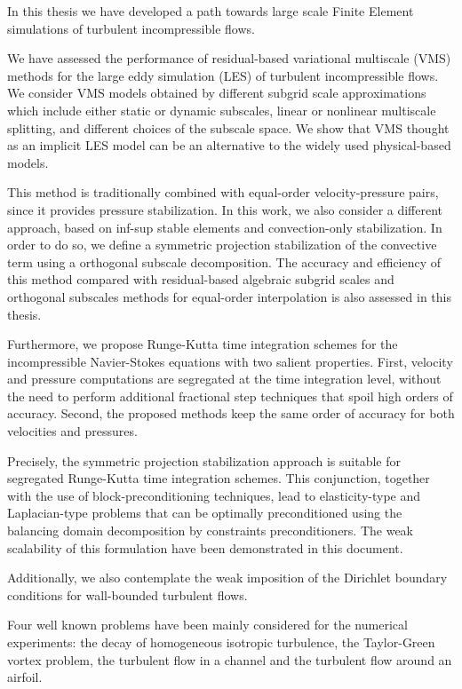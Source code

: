 In this thesis we have developed a path towards large scale Finite Element simulations of turbulent incompressible flows. 

We have assessed the performance of residual-based variational multiscale (VMS) methods for the large eddy simulation (LES) of turbulent incompressible flows. We consider VMS models obtained by different subgrid scale approximations which include either static or dynamic subscales, linear or nonlinear multiscale splitting, and different choices of the subscale space. We show that VMS thought as an implicit LES model can be an alternative to the widely used physical-based models.

This method is traditionally combined with equal-order velocity-pressure pairs, since it provides pressure stabilization. In this work, we also consider a different approach, based on inf-sup stable elements and convection-only stabilization. In order to do so, we define a symmetric projection stabilization of the convective term
using a orthogonal subscale decomposition. The accuracy and efficiency of this method compared with residual-based algebraic subgrid scales and orthogonal subscales methods for equal-order interpolation is also assessed in this thesis. 

Furthermore, we propose Runge-Kutta time integration schemes for the incompressible Navier-Stokes equations with two salient properties. First, velocity and pressure computations are segregated at the time integration level, without the need to perform additional fractional step techniques that spoil high orders of accuracy. Second, the proposed methods keep the same order of accuracy for both velocities and pressures. 

Precisely, the symmetric projection stabilization approach is suitable for segregated Runge-Kutta time integration schemes. This conjunction, together with the use of block-preconditioning techniques, lead to elasticity-type and Laplacian-type problems that can be optimally preconditioned using the balancing domain decomposition by constraints preconditioners. The weak scalability of this formulation have been demonstrated in this document.

Additionally, we also contemplate the weak imposition of the Dirichlet boundary conditions for wall-bounded turbulent flows.

Four well known problems have been mainly considered for the numerical experiments: the decay of homogeneous isotropic turbulence, the Taylor-Green vortex problem, the turbulent flow in a channel and the turbulent flow around an airfoil.